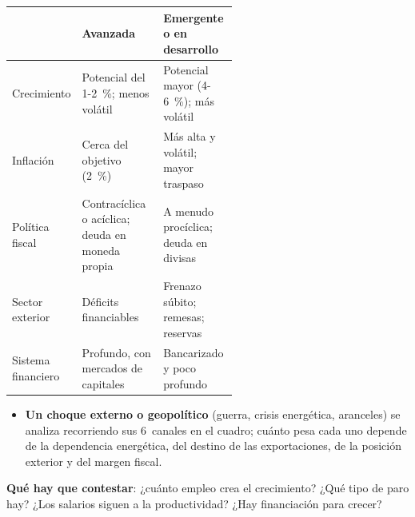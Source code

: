 \documentclass{article}
\begin{document}
\begin{columnas}
\begin{minipage}{\linewidth}
{\begin{tabularx}{\linewidth}{>{\raggedright\arraybackslash}p{0.2\linewidth}>{\raggedright\arraybackslash}p{0.36\linewidth}>{\raggedright\arraybackslash}X}
\toprule
\rowcolor{tceemoradopalido} & \textbf{Avanzada} & \textbf{Emergente o en desarrollo}\\
\midrule
Crecimiento & Potencial del 1-2~\%; menos volátil & Potencial mayor (4-6~\%); más volátil\\
\rowcolor{tceesalvia}Inflación & Cerca del objetivo (2~\%) & Más alta y volátil; mayor traspaso\\
Política fiscal & Contracíclica o acíclica; deuda en moneda propia & A menudo procíclica; deuda en divisas\\
\rowcolor{tceesalvia}Sector exterior & Déficits financiables & Frenazo súbito; remesas; reservas\\
Sistema financiero & Profundo, con mercados de capitales & Bancarizado y poco profundo\\
\bottomrule
\end{tabularx}}
\end{minipage}
\begin{itemize}[itemsep=1.5pt]
\item \textbf{Un choque externo o geopolítico} (guerra, crisis energética, aranceles) se analiza recorriendo sus 6~canales en el cuadro; cuánto pesa cada uno depende de la dependencia energética, del destino de las exportaciones, de la posición exterior y del margen fiscal.
\end{itemize}

\begin{ideaclave}
\textbf{Qué hay que contestar}: ¿cuánto empleo crea el crecimiento? ¿Qué tipo de paro hay? ¿Los salarios siguen a la productividad? ¿Hay financiación para crecer?
\end{ideaclave}


\end{columnas}
\end{document}
